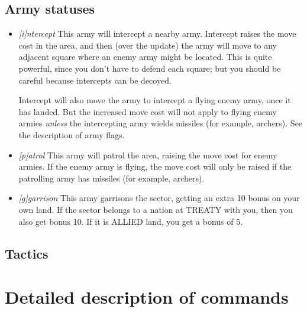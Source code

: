\section{Army statuses}
\begin{itemize}
\item
\emph{[i]ntercept} This army will intercept a nearby army.  Intercept
raises the move cost in the area, and then (over the update) the army
will move to any adjacent square where an enemy army might be located.
This is quite powerful, since you don't have to defend each square;
but you should be careful because intercepts can be decoyed.

Intercept will also move the army to intercept a flying enemy army,
once it has landed.  But the increased move cost will not apply to flying
enemy armies \emph{unless} the intercepting army wields missiles (for
example, archers).  See the description of army flags.

\item
\emph{[p]atrol} This army will patrol the area, raising the move cost
for enemy armies.  If the enemy army is flying, the move cost will
only be raised if the patrolling army has missiles (for example, archers).

\item
\emph{[g]garrison} This army garrisons the sector, getting an
extra 10 bonus on your own land.  If the sector belongs to a nation at
TREATY with you, then you also get bonus 10.  If it is ALLIED land,
you get a bonus of 5.
\end{itemize}

\comment \section{Tactics}

\chapter{Detailed description of commands}

